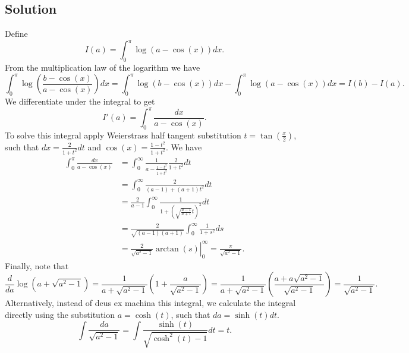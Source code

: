 \subsection*{Solution}
Define
\begin{equation*}
    I(a) = \int_0^\pi \log(a - \cos(x)) dx.
\end{equation*}
From the multiplication law of the logarithm we have
\begin{equation*}
    \int_0^\pi \log\left(\frac{b - \cos(x)}{a - \cos(x)} \right) dx
        = \int_0^\pi \log(b - \cos(x)) dx - \int_0^\pi \log(a - \cos(x)) dx
        = I(b) - I(a).
\end{equation*}
We differentiate under the integral to get
\begin{equation*}
    I'(a) = \int_0^{\pi} \frac{dx}{a - \cos(x)}.
\end{equation*}
To solve this integral apply Weierstrass half tangent substitution $t = \tan(\frac{x}{2})$, such that $dx = \frac{2}{1 + t^2}dt$ and $\cos(x) = \frac{1 - t^2}{1 + t^2}$.
We have
\begin{equation*}
    \begin{split}
        \int_0^\pi \frac{dx}{a - \cos(x)}
            &= \int_0^\infty \frac{1}{a - \frac{1 - t^2}{1 + t^2}} \frac{2}{1 + t^2} dt \\
            &= \int_0^\infty \frac{2}{(a - 1) + (a + 1)t^2} dt \\
            &= \frac{2}{a - 1} \int_0^{\infty} \frac{1}{1 + \left(\sqrt{\frac{a - 1}{a + 1}}t\right)^2} dt \\
            &= \frac{2}{\sqrt{(a - 1)(a + 1)}} \int_0^\infty \frac{1}{1 + s^2} ds \\
            &= \left. \frac{2}{\sqrt{a^2 - 1}} \arctan(s) \right|_0^{\infty}
            = \frac{\pi}{\sqrt{a^2 - 1}}.
    \end{split}
\end{equation*}
Finally, note that
\begin{equation*}
    \frac{d}{da} \log\left(a + \sqrt{a^2 - 1}\right)
        = \frac{1}{a + \sqrt{a^2 - 1}} \left(1 + \frac{a}{\sqrt{a^2 - 1}}\right)
        = \frac{1}{a + \sqrt{a^2 - 1}} \left(\frac{a + a\sqrt{a^2 - 1}}{\sqrt{a^2 - 1}}\right)
        = \frac{1}{\sqrt{a^2 - 1}}.
\end{equation*}
Alternatively, instead of deus ex machina this integral, we calculate the integral directly using the substitution $a = \cosh(t)$, such that $da = \sinh(t) dt$.
\begin{equation*}
    \int \frac{da}{\sqrt{a^2 - 1}}
        = \int \frac{\sinh(t)}{\sqrt{\cosh^2(t) - 1}} dt
        = t.
\end{equation*}
